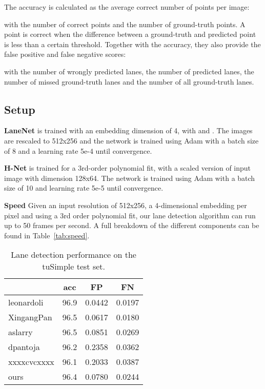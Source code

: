 \documentclass[letterpaper, 10 pt, conference]{ieeeconf}
\begin{document}
The accuracy is calculated as the average correct number of points per image: 

with  the number of correct points and  the number of ground-truth points. A point is correct when the difference between a ground-truth and predicted point is less than a certain threshold. Together with the accuracy, they also provide the false positive and false negative scores:


with  the number of wrongly predicted lanes,  the number of predicted lanes,  the number of missed ground-truth lanes and  the number of all ground-truth lanes. 

\subsection{Setup}

\textbf{LaneNet} is trained with an embedding dimension of 4, with  and . The images are rescaled to 512x256 and the network is trained using Adam with a batch size of 8 and a learning rate 5e-4 until convergence. 

\textbf{H-Net} is trained for a 3rd-order polynomial fit, with a scaled version of input image with dimension 128x64. The network is trained using Adam with a batch size of 10 and learning rate 5e-5 until convergence. 

\textbf{Speed} Given an input resolution of 512x256, a 4-dimensional embedding per pixel and using a 3rd order polynomial fit, our lane detection algorithm can run up to 50 frames per second. A full breakdown of the different components can be found in Table~\ref{tab:speed}.


\begin{table}
	\begin{center}
    \begin{tabular}{l|c|c|c}
    	& acc & FP & FN \\
		\hline
        leonardoli & 96.9 & 0.0442 & 0.0197 \\
        XingangPan & 96.5 & 0.0617 & 0.0180 \\
        aslarry & 96.5 & 0.0851 & 0.0269 \\
        dpantoja & 96.2 & 0.2358 & 0.0362 \\
        xxxxcvcxxxx & 96.1 & 0.2033 & 0.0387 \\
        \hline
		ours & 96.4 & 0.0780 & 0.0244 \\
    \end{tabular}
    \end{center}
    \caption{Lane detection performance on the tuSimple test set.}
    \label{tab:results_tusimple}
\end{table}
\end{document}
